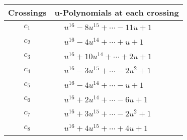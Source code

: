 \documentclass[1p]{elsarticle_modified}
\theoremstyle{definition}
\begin{document}
\begin{tabular}{m{50pt}|m{274pt}}
Crossings & \hspace{64pt}u-Polynomials at each crossing \\
\hline $$\begin{aligned}c_{1}\end{aligned}$$&$\begin{aligned}
&u^{16}-8 u^{15}+\cdots-11 u+1
\end{aligned}$\\
\hline $$\begin{aligned}c_{2}\end{aligned}$$&$\begin{aligned}
&u^{16}-4 u^{14}+\cdots+u+1
\end{aligned}$\\
\hline $$\begin{aligned}c_{3}\end{aligned}$$&$\begin{aligned}
&u^{16}+10 u^{14}+\cdots+2 u+1
\end{aligned}$\\
\hline $$\begin{aligned}c_{4}\end{aligned}$$&$\begin{aligned}
&u^{16}-3 u^{15}+\cdots-2 u^2+1
\end{aligned}$\\
\hline $$\begin{aligned}c_{5}\end{aligned}$$&$\begin{aligned}
&u^{16}-4 u^{14}+\cdots- u+1
\end{aligned}$\\
\hline $$\begin{aligned}c_{6}\end{aligned}$$&$\begin{aligned}
&u^{16}+2 u^{14}+\cdots-6 u+1
\end{aligned}$\\
\hline $$\begin{aligned}c_{7}\end{aligned}$$&$\begin{aligned}
&u^{16}+3 u^{15}+\cdots-2 u^2+1
\end{aligned}$\\
\hline $$\begin{aligned}c_{8}\end{aligned}$$&$\begin{aligned}
&u^{16}+4 u^{15}+\cdots+4 u+1
\end{aligned}$\\

\end{tabular}
\end{document}
